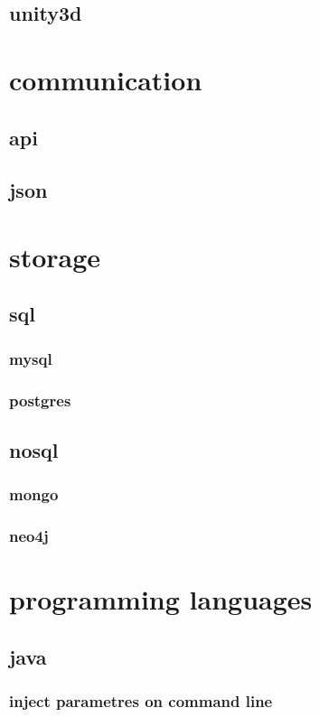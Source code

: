 \documentclass{report}
\begin{document}
\section{unity3d}


\chapter{communication}
\section{api}
\section{json}

\chapter{storage}
\section{sql}
\subsection{mysql}
\subsection{postgres}

\section{nosql}
\subsection{mongo}
\subsection{neo4j}

\chapter{programming languages}
\section{java}
\subsection{inject parametres on command line}
\end{document}
